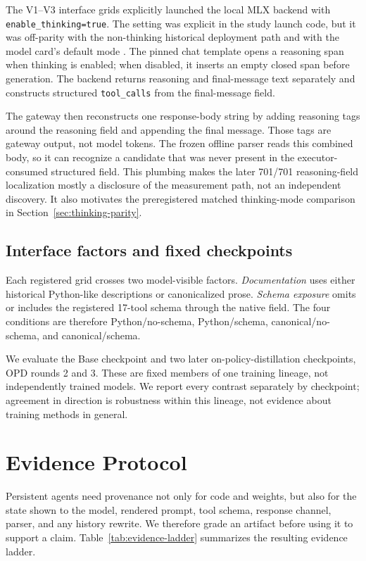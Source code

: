 \documentclass[10pt]{article}
\begin{document}
The V1--V3 interface grids explicitly launched the local MLX backend with
\texttt{enable\_thinking=true}. The setting was explicit in the study launch
code, but it was off-parity with the non-thinking historical deployment path and with
the model card's default mode \citep{qwen35modelcards2026}. The pinned chat
template opens a reasoning span when thinking is enabled; when disabled, it
inserts an empty closed span before generation. The backend returns reasoning
and final-message text separately and constructs structured
\texttt{tool\_calls} from the final-message field.

The gateway then reconstructs one response-body string by adding reasoning
tags around the reasoning field and appending the final message. Those tags are
gateway output, not model tokens. The frozen offline parser reads this combined
body, so it can recognize a candidate that was never present in the
executor-consumed structured field. This plumbing makes the later 701/701
reasoning-field localization mostly a disclosure of the measurement path, not
an independent discovery. It also motivates the preregistered matched
thinking-mode comparison in Section~\ref{sec:thinking-parity}.

\subsection{Interface factors and fixed checkpoints}

Each registered grid crosses two model-visible factors. \emph{Documentation}
uses either historical Python-like descriptions or canonicalized prose.
\emph{Schema exposure} omits or includes the registered 17-tool schema through
the native field. The four conditions are therefore Python/no-schema,
Python/schema, canonical/no-schema, and canonical/schema.

We evaluate the Base checkpoint and two later on-policy-distillation checkpoints,
OPD rounds 2 and 3. These are fixed members of one training lineage, not
independently trained models. We report every contrast separately by checkpoint;
agreement in direction is robustness within this lineage, not evidence about
training methods in general.

\section{Evidence Protocol}

Persistent agents need provenance not only for code and weights, but also for
the state shown to the model, rendered prompt, tool schema, response channel,
parser, and any history rewrite. We therefore grade an artifact before using it
to support a claim. Table~\ref{tab:evidence-ladder} summarizes the resulting
evidence ladder.
\end{document}

